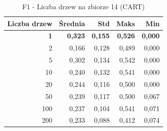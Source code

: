 \begin{table}[htbp]
\centering
\small
\setlength{\tabcolsep}{6pt}
\renewcommand{\arraystretch}{1.2}
\caption{F1 - Liczba drzew na zbiorze 14 (CART)}
\label{tab:CART_tree_count_14_f1}
\begin{tabular}{r|r|r|r|r}
\toprule
Liczba drzew & Średnia & Std & Maks & Min \\
\hline
\textbf{1} & \textbf{0,323} & \textbf{0,155} & \textbf{0,526} & \textbf{0,000} \\
2 & 0,166 & 0,128 & 0,489 & 0,000 \\
5 & 0,302 & 0,134 & 0,542 & 0,000 \\
10 & 0,240 & 0,132 & 0,541 & 0,000 \\
20 & 0,244 & 0,116 & 0,500 & 0,000 \\
50 & 0,239 & 0,117 & 0,500 & 0,067 \\
100 & 0,237 & 0,104 & 0,541 & 0,071 \\
200 & 0,233 & 0,088 & 0,412 & 0,074 \\
\bottomrule
\end{tabular}
\end{table}